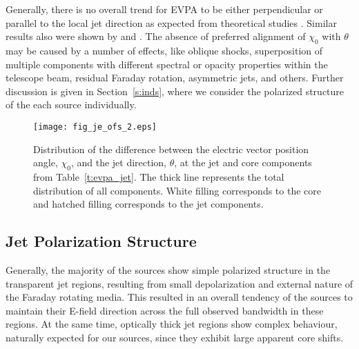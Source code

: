 \documentclass[a4paper,fleqn,usenatbib,useAMS]{mnras}
\begin{document}
Generally, there is no overall trend for EVPA to be either perpendicular or parallel to the local jet direction as expected from theoretical studies \citep[e.g.][]{1980MNRAS.193..439L,lyutikov_etal05,2006MNRAS.367..851C,2009MNRAS.395..524N}.
Similar results also were shown by \citet{pollack_etal03,lister_homan_05,hovatta_etal12} and \citet{agudo_etal14}. 
The absence of preferred alignment of $\chi_0$ with $\theta$ may be caused by a number of effects, like oblique shocks, superposition of multiple components with different spectral or opacity properties within the telescope beam, residual Faraday rotation, asymmetric jets, and others.
Further discussion is given in Section~\ref{s:inds}, where we consider the polarized structure of the each source individually.


\begin{figure}
 \centering
 \texttt{[image: fig\_je\_ofs\_2.eps]}\\
 \caption{Distribution of the difference between the electric vector position angle, $\chi_0$, and the jet direction, $\theta$, at the jet and core components from Table~\ref{t:evpa_jet}.
The thick line represents the total distribution of all components. 
White filling corresponds to the core and hatched filling corresponds to the jet components. 
  \label{evpa_jet}}
\end{figure}






\subsection{Jet Polarization Structure}

Generally, the majority of the sources show simple polarized structure in the transparent jet regions, resulting from small depolarization and external nature of the Faraday rotating media. 
This resulted in an overall tendency of the sources to maintain their E-field direction across the full observed bandwidth in these regions.
At the same time, optically thick jet regions show complex behaviour, naturally expected for our sources, since they exhibit large apparent core shifts.
\end{document}
